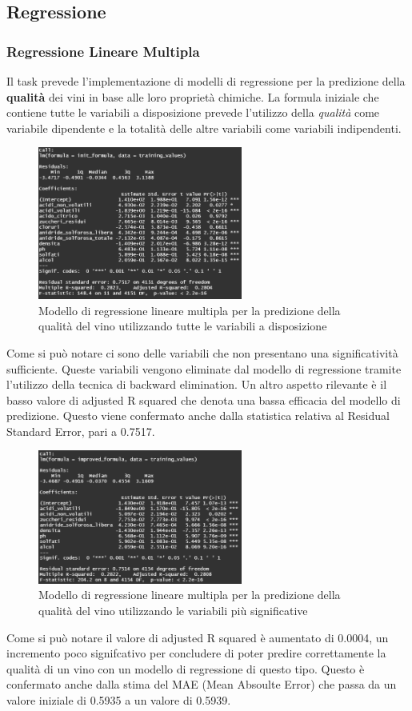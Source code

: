 \documentclass[12pt]{article}
\begin{document}
\subsection{Regressione}
\subsubsection{Regressione Lineare Multipla}
Il task prevede l'implementazione di modelli di regressione per la predizione della \textbf{qualità} dei vini in base alle loro proprietà chimiche. La formula iniziale che contiene tutte le variabili a disposizione prevede l'utilizzo della \textit{qualità} come variabile dipendente e la totalità delle altre variabili come variabili indipendenti.
\begin{figure}[!htb]
    \centering
    \includegraphics[width=0.6\textwidth]{immagini/init.png}
    \caption{Modello di regressione lineare multipla per la predizione della qualità del vino utilizzando tutte le variabili a disposizione}
\end{figure}
\FloatBarrier
Come si può notare ci sono delle variabili che non presentano una significatività sufficiente. Queste variabili vengono eliminate dal modello di regressione tramite l'utilizzo della tecnica di backward elimination. Un altro aspetto rilevante è il basso valore di adjusted R squared che denota una bassa efficacia del modello di predizione. Questo viene confermato anche dalla statistica relativa al Residual Standard Error, pari a 0.7517.
\begin{figure}[!htb]
    \centering
    \includegraphics[width=0.6\textwidth]{immagini/impr.png}
    \caption{Modello di regressione lineare multipla per la predizione della qualità del vino utilizzando le variabili più significative}
\end{figure}
\FloatBarrier
Come si può notare il valore di adjusted R squared è aumentato di 0.0004, un incremento poco signifcativo per concludere di poter predire correttamente la qualità di un vino con un modello di regressione di questo tipo. Questo è confermato anche dalla stima del MAE (Mean Absoulte Error) che passa da un valore iniziale di 0.5935 a un valore di 0.5939.
\newpage
\end{document}
